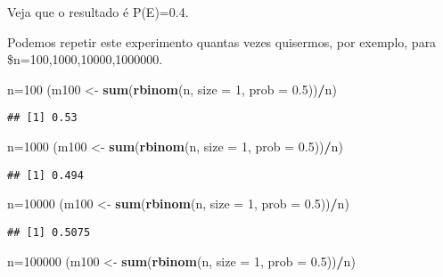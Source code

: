 \documentclass[]{book}
\newenvironment{Shaded}{\begin{snugshade}}{\end{snugshade}}
\newcommand{\DataTypeTok}[1]{\textcolor[rgb]{0.13,0.29,0.53}{#1}}
\newcommand{\DecValTok}[1]{\textcolor[rgb]{0.00,0.00,0.81}{#1}}
\newcommand{\FloatTok}[1]{\textcolor[rgb]{0.00,0.00,0.81}{#1}}
\newcommand{\KeywordTok}[1]{\textcolor[rgb]{0.13,0.29,0.53}{\textbf{#1}}}
\newcommand{\NormalTok}[1]{#1}
\newcommand{\OperatorTok}[1]{\textcolor[rgb]{0.81,0.36,0.00}{\textbf{#1}}}
\newcommand{\StringTok}[1]{\textcolor[rgb]{0.31,0.60,0.02}{#1}}
\theoremstyle{definition}
\theoremstyle{definition}
\theoremstyle{definition}
\theoremstyle{remark}
\begin{document}
Veja que o resultado é P(E)=0.4.

Podemos repetir este experimento quantas vezes quisermos, por exemplo, para \$n=100,1000,10000,1000000.

\begin{Shaded}
\begin{Highlighting}[]
\NormalTok{n=}\DecValTok{100}
\NormalTok{(m100 <-}\StringTok{ }\KeywordTok{sum}\NormalTok{(}\KeywordTok{rbinom}\NormalTok{(n, }\DataTypeTok{size =} \DecValTok{1}\NormalTok{, }\DataTypeTok{prob =} \FloatTok{0.5}\NormalTok{))}\OperatorTok{/}\NormalTok{n)}
\end{Highlighting}
\end{Shaded}

\begin{verbatim}
## [1] 0.53
\end{verbatim}

\begin{Shaded}
\begin{Highlighting}[]
\NormalTok{n=}\DecValTok{1000}
\NormalTok{(m100 <-}\StringTok{ }\KeywordTok{sum}\NormalTok{(}\KeywordTok{rbinom}\NormalTok{(n, }\DataTypeTok{size =} \DecValTok{1}\NormalTok{, }\DataTypeTok{prob =} \FloatTok{0.5}\NormalTok{))}\OperatorTok{/}\NormalTok{n)}
\end{Highlighting}
\end{Shaded}

\begin{verbatim}
## [1] 0.494
\end{verbatim}

\begin{Shaded}
\begin{Highlighting}[]
\NormalTok{n=}\DecValTok{10000}
\NormalTok{(m100 <-}\StringTok{ }\KeywordTok{sum}\NormalTok{(}\KeywordTok{rbinom}\NormalTok{(n, }\DataTypeTok{size =} \DecValTok{1}\NormalTok{, }\DataTypeTok{prob =} \FloatTok{0.5}\NormalTok{))}\OperatorTok{/}\NormalTok{n)}
\end{Highlighting}
\end{Shaded}

\begin{verbatim}
## [1] 0.5075
\end{verbatim}

\begin{Shaded}
\begin{Highlighting}[]
\NormalTok{n=}\DecValTok{100000}
\NormalTok{(m100 <-}\StringTok{ }\KeywordTok{sum}\NormalTok{(}\KeywordTok{rbinom}\NormalTok{(n, }\DataTypeTok{size =} \DecValTok{1}\NormalTok{, }\DataTypeTok{prob =} \FloatTok{0.5}\NormalTok{))}\OperatorTok{/}\NormalTok{n)}
\end{Highlighting}
\end{Shaded}
\end{document}

